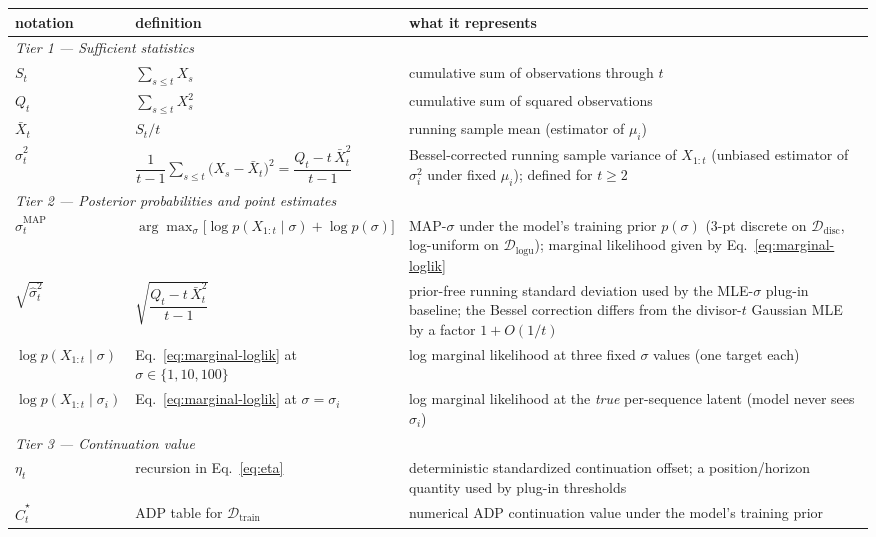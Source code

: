 \documentclass[11pt]{article}
\begin{document}
\begin{table}[H]
\centering
\small
\renewcommand{\arraystretch}{1.25}
\begin{tabular}{l l p{}}
\hline
notation & definition & what it represents \\
\hline
\multicolumn{3}{l}{\textit{Tier 1 --- Sufficient statistics}} \\
$S_t$ & $\sum_{s \le t} X_s$ & cumulative sum of observations through $t$ \\
$Q_t$ & $\sum_{s \le t} X_s^2$ & cumulative sum of squared observations \\
$\bar X_t$ & $S_t / t$ & running sample mean (estimator of $\mu_i$) \\
$\hat\sigma_t^2$ & $\dfrac{1}{t-1}\sum_{s\le t}\bigl(X_s - \bar X_t\bigr)^2 = \dfrac{Q_t - t\,\bar X_t^2}{t-1}$ & Bessel-corrected running sample variance of $X_{1:t}$ (unbiased estimator of $\sigma_i^2$ under fixed $\mu_i$); defined for $t \ge 2$ \\
\hline
\multicolumn{3}{l}{\textit{Tier 2 --- Posterior probabilities and point estimates}} \\
$\hat\sigma_t^{\mathrm{MAP}}$ & $\displaystyle\arg\max_{\sigma}\bigl[\log p(X_{1:t}\mid\sigma) + \log p(\sigma)\bigr]$ & MAP-$\sigma$ under the model's training prior $p(\sigma)$ (3-pt discrete on $\mathcal{D}_{\mathrm{disc}}$, log-uniform on $\mathcal{D}_{\mathrm{logu}}$); marginal likelihood given by Eq.~\eqref{eq:marginal-loglik} \\
$\sqrt{\hat\sigma_t^2}$ & $\sqrt{\dfrac{Q_t - t\,\bar X_t^2}{t - 1}}$ & prior-free running standard deviation used by the MLE-$\sigma$ plug-in baseline; the Bessel correction differs from the divisor-$t$ Gaussian MLE by a factor $1 + O(1/t)$ \\
$\log p(X_{1:t} \mid \sigma)$ & Eq.~\eqref{eq:marginal-loglik} at $\sigma \in \{1, 10, 100\}$ & log marginal likelihood at three fixed $\sigma$ values (one target each) \\
$\log p(X_{1:t} \mid \sigma_i)$ & Eq.~\eqref{eq:marginal-loglik} at $\sigma = \sigma_i$ & log marginal likelihood at the \emph{true} per-sequence latent (model never sees $\sigma_i$) \\
\hline
\multicolumn{3}{l}{\textit{Tier 3 --- Continuation value}} \\
\(\eta_t\) & recursion in Eq.~\eqref{eq:eta} & deterministic standardized continuation offset; a position/horizon quantity used by plug-in thresholds \\
$\widehat C_t^\star$ & ADP table for $\mathcal{D}_\mathrm{train}$ & numerical ADP continuation value under the model's training prior \\

\end{tabular}
\end{table}
\end{document}
